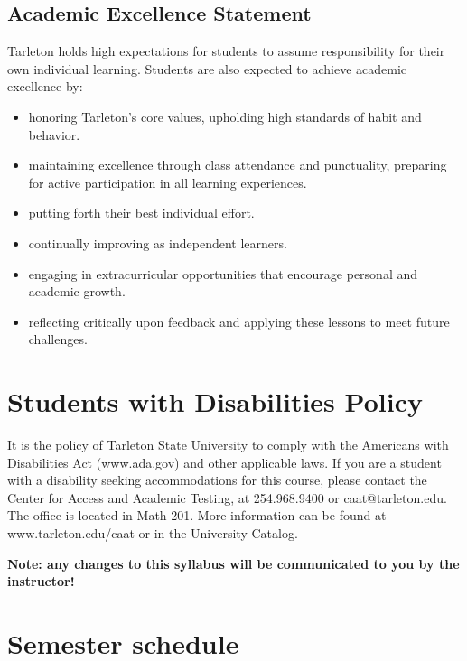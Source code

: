 \documentclass[10pt]{article}
\begin{document}
\subsection*{Academic Excellence Statement}
\label{sec-9-3}
Tarleton holds high expectations for students to assume responsibility for their own individual learning. Students are also expected to achieve academic excellence by:
\begin{itemize}
\item honoring Tarleton’s core values, upholding high standards of habit and behavior.
\item maintaining excellence through class attendance and punctuality, preparing for active participation in all learning experiences.
\item putting forth their best individual effort.
\item continually improving as independent learners.
\item engaging in extracurricular opportunities that encourage personal and academic growth.
\item reflecting critically upon feedback and applying these lessons to meet future challenges.
\end{itemize}

\section*{Students with Disabilities Policy}
\label{sec-10}

It is the policy of Tarleton State University to comply with the Americans with Disabilities  Act (www.ada.gov) and other applicable laws.  If you are a student with a disability seeking accommodations for this course, please contact the Center for Access and Academic Testing, at 254.968.9400 or caat@tarleton.edu. The office is located in Math 201. More information can be found at www.tarleton.edu/caat or in the University Catalog.​

\textbf{Note:  any changes to this syllabus will be communicated to you by the instructor!}

\section*{Semester schedule}
\label{sec-11}
\end{document}
